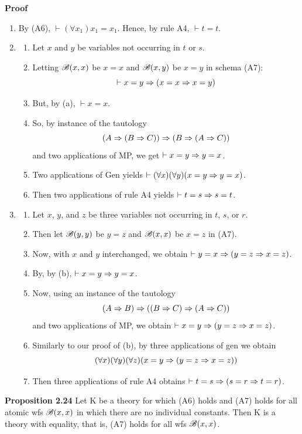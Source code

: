 \textbf{Proof}
\begin{enumerate} [label = \alph*.]
    \item By (A6), $\vdash (\forall x_1) x_1=x_1$. Hence, by rule A4, $\vdash t=t$.
    \item \begin{enumerate} [label = \roman*.]
        \item Let $x$ and $y$ be variables not occurring in $t$ or $s$.
        \item Letting $\mathscr{B}(x,x)$ be $x=x$ and $\mathscr{B}(x,y)$ be $x=y$ in schema (A7): \[\vdash x=y \Rightarrow (x=x \Rightarrow x=y)\]
        \item But, by (a), $\vdash x=x$.
        \item So, by instance of the tautology
        \[(A\Rightarrow (B \Rightarrow C)) \Rightarrow (B \Rightarrow (A \Rightarrow C))\]
        and two applications of MP, we get $\vdash x=y \Rightarrow y=x$.
        \item Two applications of Gen yields $\vdash(\forall x)(\forall y)(x=y \Rightarrow y=x)$.
        \item Then two applications of rule A4 yields $\vdash t=s \Rightarrow s=t$.
    \end{enumerate}
    \item \begin{enumerate} [label = \roman*.]
        \item Let $x$, $y$, and $z$ be three variables not occurring in $t$, $s$, or $r$.
        \item Then let $\mathscr{B}(y,y)$ be $y=z$ and $\mathscr{B}(x,x)$ be $x=z$ in (A7).
        \item Now, with $x$ and $y$ interchanged, we obtain $\vdash y=x \Rightarrow(y=z \Rightarrow x=z)$.
        \item By, by (b), $\vdash x=y \Rightarrow y=x$.
        \item Now, using an instance of the tautology
        \[(A\Rightarrow B) \Rightarrow ((B \Rightarrow C) \Rightarrow (A \Rightarrow C))\]
        and two applications of MP, we obtain $\vdash x=y\Rightarrow(y=z\Rightarrow x=z)$.
        \item Similarly to our proof of (b), by three applications of gen we obtain 
        \[(\forall x)(\forall y)(\forall z)(x=y \Rightarrow (y=z \Rightarrow x=z))\]
        \item Then three applications of rule A4 obtains $\vdash t=s \Rightarrow (s=r \Rightarrow t=r)$.
    \end{enumerate}
\end{enumerate}

\textbf{Proposition 2.24}
Let K be a theory for which (A6) holds and (A7) holds for all atomic wfs $\mathscr{B}(x,x)$ in which there are no individual constants. Then K is a theory with equality, that is, (A7) holds for all wfs $\mathscr{B}(x,x)$.


